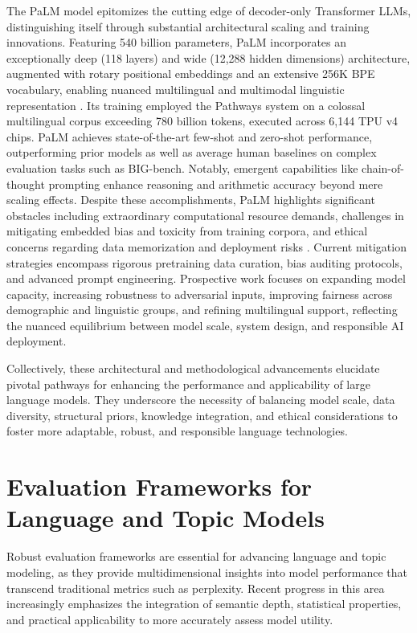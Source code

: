 \documentclass[sigconf]{acmart}
\begin{document}
The PaLM model epitomizes the cutting edge of decoder-only Transformer LLMs, distinguishing itself through substantial architectural scaling and training innovations. Featuring 540 billion parameters, PaLM incorporates an exceptionally deep (118 layers) and wide (12,288 hidden dimensions) architecture, augmented with rotary positional embeddings and an extensive 256K BPE vocabulary, enabling nuanced multilingual and multimodal linguistic representation \cite{ref7}. Its training employed the Pathways system on a colossal multilingual corpus exceeding 780 billion tokens, executed across 6,144 TPU v4 chips. PaLM achieves state-of-the-art few-shot and zero-shot performance, outperforming prior models as well as average human baselines on complex evaluation tasks such as BIG-bench. Notably, emergent capabilities like chain-of-thought prompting enhance reasoning and arithmetic accuracy beyond mere scaling effects. Despite these accomplishments, PaLM highlights significant obstacles including extraordinary computational resource demands, challenges in mitigating embedded bias and toxicity from training corpora, and ethical concerns regarding data memorization and deployment risks \cite{ref7}. Current mitigation strategies encompass rigorous pretraining data curation, bias auditing protocols, and advanced prompt engineering. Prospective work focuses on expanding model capacity, increasing robustness to adversarial inputs, improving fairness across demographic and linguistic groups, and refining multilingual support, reflecting the nuanced equilibrium between model scale, system design, and responsible AI deployment.

Collectively, these architectural and methodological advancements elucidate pivotal pathways for enhancing the performance and applicability of large language models. They underscore the necessity of balancing model scale, data diversity, structural priors, knowledge integration, and ethical considerations to foster more adaptable, robust, and responsible language technologies.


\section{Evaluation Frameworks for Language and Topic Models}

Robust evaluation frameworks are essential for advancing language and topic modeling, as they provide multidimensional insights into model performance that transcend traditional metrics such as perplexity. Recent progress in this area increasingly emphasizes the integration of semantic depth, statistical properties, and practical applicability to more accurately assess model utility.
\end{document}

